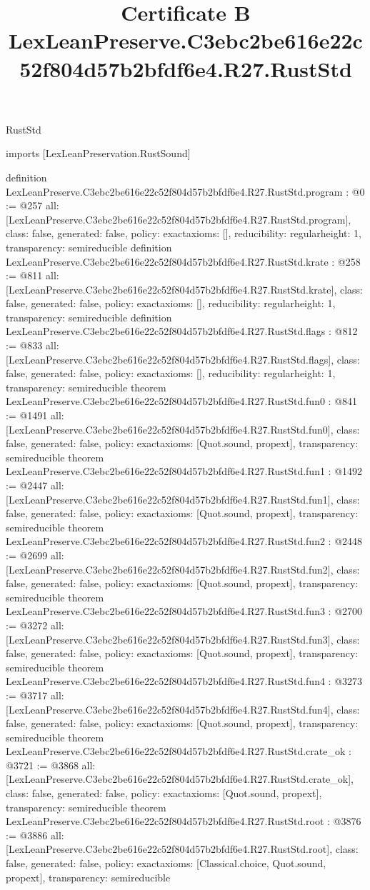 \begin{lexlean}{RustStd}
\title{Certificate B LexLeanPreserve.C3ebc2be616e22c52f804d57b2bfdf6e4.R27.RustStd}
\begin{coremodule}
imports [LexLeanPreservation.RustSound]

definition LexLeanPreserve.C3ebc2be616e22c52f804d57b2bfdf6e4.R27.RustStd.program : @0 := @257 {
  all: [LexLeanPreserve.C3ebc2be616e22c52f804d57b2bfdf6e4.R27.RustStd.program],
  class: false,
  generated: false,
  policy: exact{axioms: []},
  reducibility: regular{height: 1},
  transparency: semireducible
}
definition LexLeanPreserve.C3ebc2be616e22c52f804d57b2bfdf6e4.R27.RustStd.krate : @258 := @811 {
  all: [LexLeanPreserve.C3ebc2be616e22c52f804d57b2bfdf6e4.R27.RustStd.krate],
  class: false,
  generated: false,
  policy: exact{axioms: []},
  reducibility: regular{height: 1},
  transparency: semireducible
}
definition LexLeanPreserve.C3ebc2be616e22c52f804d57b2bfdf6e4.R27.RustStd.flags : @812 := @833 {
  all: [LexLeanPreserve.C3ebc2be616e22c52f804d57b2bfdf6e4.R27.RustStd.flags],
  class: false,
  generated: false,
  policy: exact{axioms: []},
  reducibility: regular{height: 1},
  transparency: semireducible
}
theorem LexLeanPreserve.C3ebc2be616e22c52f804d57b2bfdf6e4.R27.RustStd.fun0 : @841 := @1491 {
  all: [LexLeanPreserve.C3ebc2be616e22c52f804d57b2bfdf6e4.R27.RustStd.fun0],
  class: false,
  generated: false,
  policy: exact{axioms: [Quot.sound, propext]},
  transparency: semireducible
}
theorem LexLeanPreserve.C3ebc2be616e22c52f804d57b2bfdf6e4.R27.RustStd.fun1 : @1492 := @2447 {
  all: [LexLeanPreserve.C3ebc2be616e22c52f804d57b2bfdf6e4.R27.RustStd.fun1],
  class: false,
  generated: false,
  policy: exact{axioms: [Quot.sound, propext]},
  transparency: semireducible
}
theorem LexLeanPreserve.C3ebc2be616e22c52f804d57b2bfdf6e4.R27.RustStd.fun2 : @2448 := @2699 {
  all: [LexLeanPreserve.C3ebc2be616e22c52f804d57b2bfdf6e4.R27.RustStd.fun2],
  class: false,
  generated: false,
  policy: exact{axioms: [Quot.sound, propext]},
  transparency: semireducible
}
theorem LexLeanPreserve.C3ebc2be616e22c52f804d57b2bfdf6e4.R27.RustStd.fun3 : @2700 := @3272 {
  all: [LexLeanPreserve.C3ebc2be616e22c52f804d57b2bfdf6e4.R27.RustStd.fun3],
  class: false,
  generated: false,
  policy: exact{axioms: [Quot.sound, propext]},
  transparency: semireducible
}
theorem LexLeanPreserve.C3ebc2be616e22c52f804d57b2bfdf6e4.R27.RustStd.fun4 : @3273 := @3717 {
  all: [LexLeanPreserve.C3ebc2be616e22c52f804d57b2bfdf6e4.R27.RustStd.fun4],
  class: false,
  generated: false,
  policy: exact{axioms: [Quot.sound, propext]},
  transparency: semireducible
}
theorem LexLeanPreserve.C3ebc2be616e22c52f804d57b2bfdf6e4.R27.RustStd.crate_ok : @3721 := @3868 {
  all: [LexLeanPreserve.C3ebc2be616e22c52f804d57b2bfdf6e4.R27.RustStd.crate_ok],
  class: false,
  generated: false,
  policy: exact{axioms: [Quot.sound, propext]},
  transparency: semireducible
}
theorem LexLeanPreserve.C3ebc2be616e22c52f804d57b2bfdf6e4.R27.RustStd.root : @3876 := @3886 {
  all: [LexLeanPreserve.C3ebc2be616e22c52f804d57b2bfdf6e4.R27.RustStd.root],
  class: false,
  generated: false,
  policy: exact{axioms: [Classical.choice, Quot.sound, propext]},
  transparency: semireducible
}


\end{coremodule}
\end{lexlean}

